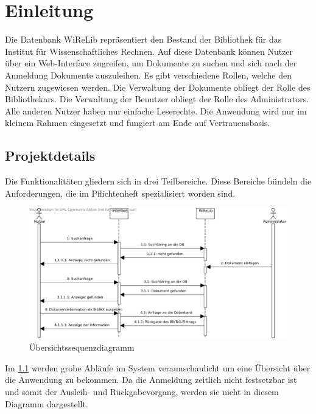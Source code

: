 
\chapter{Einleitung}
Die Datenbank WiReLib repräsentiert den Bestand der Bibliothek für das Institut für Wissenschaftliches Rechnen.
Auf diese Datenbank können Nutzer über ein Web-Interface zugreifen, um Dokumente zu suchen und sich nach der Anmeldung Dokumente auszuleihen.
Es gibt verschiedene Rollen, welche den Nutzern zugewiesen werden.
Die Verwaltung der Dokumente obliegt der Rolle des Bibliothekars.
Die Verwaltung der Benutzer obliegt der Rolle des Administrators.
Alle anderen Nutzer haben nur einfache Leserechte.
Die Anwendung wird nur im kleinem Rahmen eingesetzt und fungiert am Ende auf
Vertrauensbasis.

\section{Projektdetails}
Die Funktionalitäten gliedern sich in drei Teilbereiche.
Diese Bereiche bündeln die Anforderungen, die im Pflichtenheft spezialisiert
worden sind.

\begin{figure}[h]
\begin{center}
\includegraphics[width=0.9\linewidth]{bilder/Seq-Uebersicht.pdf}
\caption[Übersichtssequenzdiagramm]{Übersichtssequenzdiagramm}
\label{Seq-Übersicht}
\end{center}
\end{figure}

Im \ref{Seq-Übersicht}  werden grobe Abläufe im System 
veraunschaulicht um eine Übersicht über die Anwendung zu bekommen.
Da die Anmeldung zeitlich nicht festsetzbar ist und somit der Ausleih- und
Rückgabevorgang, werden sie nicht in diesem Diagramm dargestellt.

